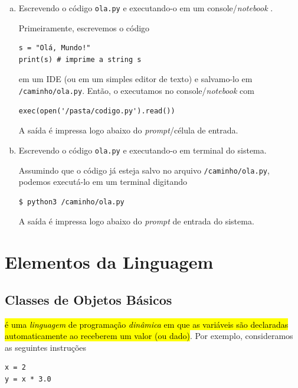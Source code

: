 \documentclass[12pt]{article}
\begin{document}
\begin{ex}
\begin{enumerate}[a)]
  \item Escrevendo o código \verb+ola.py+ e executando-o em um console/\textit{notebook} {\python}.
  
  Primeiramente, escrevemos o código

\begin{lstlisting}
s = "Olá, Mundo!"
print(s) # imprime a string s
\end{lstlisting}

em um IDE (ou em um simples editor de texto) e salvamo-lo em \lstinline+/caminho/ola.py+. Então, o executamos no console/\textit{notebook} {\python} com

\begin{lstlisting}
exec(open('/pasta/codigo.py').read())
\end{lstlisting}

A saída é impressa logo abaixo do \textit{prompt}/célula de entrada.
  
  \item Escrevendo o código \verb+ola.py+ e executando-o em terminal do sistema.
  
  Assumindo que o código já esteja salvo no arquivo \lstinline+/caminho/ola.py+, podemos executá-lo em um terminal digitando

\begin{lstlisting}
$ python3 /caminho/ola.py
\end{lstlisting}

  A saída é impressa logo abaixo do \textit{prompt} de entrada do sistema.
\end{enumerate}

\end{ex}

\section{Elementos da Linguagem}\label{sec_elem}

\subsection{Classes de Objetos Básicos}

\hl{{\python} é uma \emph{linguagem} de programação \emph{dinâmica} em que as variáveis são declaradas automaticamente ao receberem um valor (ou dado)}. Por exemplo, consideramos as seguintes instruções

\begin{lstlisting}
x = 2
y = x * 3.0
\end{lstlisting}
\end{document}
